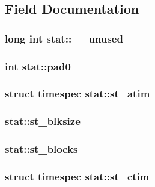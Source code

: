 \subsection{Field Documentation}
\subsubsection[{\_\-\_\-unused}]{\setlength{\rightskip}{0pt plus 5cm}long int {\bf stat::\_\-\_\-unused}}\label{structstat_ac795a601f5c358823589bbbe5fdc853d}
\subsubsection[{pad0}]{\setlength{\rightskip}{0pt plus 5cm}int {\bf stat::pad0}}\label{structstat_a010cafc95decd699cd9b4b5d7954aec3}
\subsubsection[{st\_\-atim}]{\setlength{\rightskip}{0pt plus 5cm}struct {\bf timespec} {\bf stat::st\_\-atim}}\label{structstat_a8447c545451bec2b95f9d67787404934}
\subsubsection[{st\_\-blksize}]{ {\bf stat::st\_\-blksize}}\label{structstat_a147cec6b739f3e78af39f5adba5ad45b}
\subsubsection[{st\_\-blocks}]{ {\bf stat::st\_\-blocks}}\label{structstat_a4c3fb39947cc81328e6f8ab0cec14681}
\subsubsection[{st\_\-ctim}]{\setlength{\rightskip}{0pt plus 5cm}struct {\bf timespec} {\bf stat::st\_\-ctim}}\label{structstat_a8fcf65727b775d92b773776ed1210c8b}
